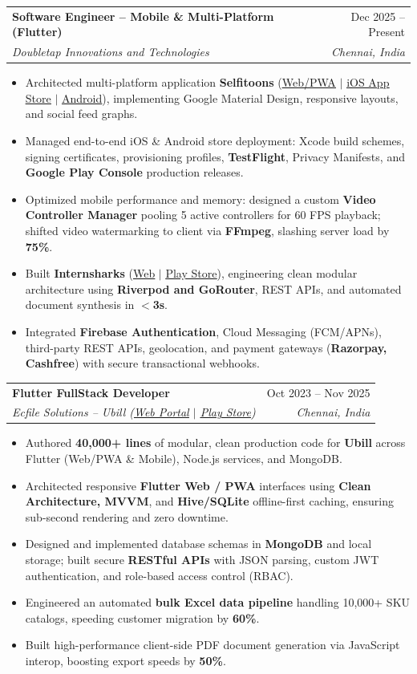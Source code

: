 \documentclass[letterpaper,10pt]{article}
\makeatletter
\newcommand{\resumeItem}[1]{
  \item\small{
    {#1 \vspace{-2pt}}
  }
}
\newcommand{\resumeSubheading}[4]{
  \vspace{-2pt}\item
    \begin{tabular*}{0.97\textwidth}[t]{l@{\extracolsep{\fill}}r}
      \textbf{#1} & #2 \\
      \textit{\small#3} & \textit{\small #4} \\
    \end{tabular*}\vspace{-6pt}
}
\newcommand{\resumeItemListStart}{\begin{itemize}}
\newcommand{\resumeItemListEnd}{\end{itemize}\vspace{-5pt}}
\makeatother
\begin{document}
    \resumeSubheading
      {Software Engineer -- Mobile \& Multi-Platform (Flutter)}{Dec 2025 -- Present}
      {Doubletap Innovations and Technologies}{Chennai, India}
      \resumeItemListStart
        \resumeItem{Architected multi-platform application \textbf{Selfitoons} (\href{https://selfitoons.ai/}{\underline{Web/PWA}} $|$ \href{https://apps.apple.com/in/app/selfitoons/id6758597947}{\underline{iOS App Store}} $|$ \href{https://play.google.com/store/apps/details?id=com.doubletap.ai.selfitoons}{\underline{Android}}), implementing Google Material Design, responsive layouts, and social feed graphs.}
        \resumeItem{Managed end-to-end iOS \& Android store deployment: Xcode build schemes, signing certificates, provisioning profiles, \textbf{TestFlight}, Privacy Manifests, and \textbf{Google Play Console} production releases.}
        \resumeItem{Optimized mobile performance and memory: designed a custom \textbf{Video Controller Manager} pooling 5 active controllers for 60 FPS playback; shifted video watermarking to client via \textbf{FFmpeg}, slashing server load by \textbf{75\%}.}
        \resumeItem{Built \textbf{Internsharks} (\href{https://internsharks.ai/}{\underline{Web}} $|$ \href{https://play.google.com/store/apps/details?id=com.doubletap.internsharks.ai}{\underline{Play Store}}), engineering clean modular architecture using \textbf{Riverpod and GoRouter}, REST APIs, and automated document synthesis in \textbf{$<$3s}.}
        \resumeItem{Integrated \textbf{Firebase Authentication}, Cloud Messaging (FCM/APNs), third-party REST APIs, geolocation, and payment gateways (\textbf{Razorpay, Cashfree}) with secure transactional webhooks.}
      \resumeItemListEnd

    \resumeSubheading
      {Flutter FullStack Developer}{Oct 2023 -- Nov 2025}
      {Ecfile Solutions -- Ubill (\href{https://app.ubill.tech/}{\underline{Web Portal}} $|$ \href{https://play.google.com/store/apps/details?id=com.ubill.tech}{\underline{Play Store}})}{Chennai, India}
      \resumeItemListStart
        \resumeItem{Authored \textbf{40,000+ lines} of modular, clean production code for \textbf{Ubill} across Flutter (Web/PWA \& Mobile), Node.js services, and MongoDB.}
        \resumeItem{Architected responsive \textbf{Flutter Web / PWA} interfaces using \textbf{Clean Architecture, MVVM}, and \textbf{Hive/SQLite} offline-first caching, ensuring sub-second rendering and zero downtime.}
        \resumeItem{Designed and implemented database schemas in \textbf{MongoDB} and local storage; built secure \textbf{RESTful APIs} with JSON parsing, custom JWT authentication, and role-based access control (RBAC).}
        \resumeItem{Engineered an automated \textbf{bulk Excel data pipeline} handling 10,000+ SKU catalogs, speeding customer migration by \textbf{60\%}.}
        \resumeItem{Built high-performance client-side PDF document generation via JavaScript interop, boosting export speeds by \textbf{50\%}.}
      \resumeItemListEnd
\end{document}
